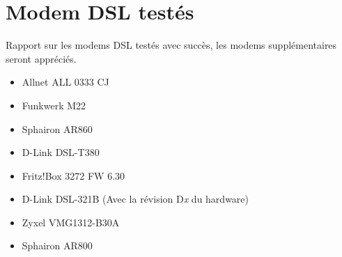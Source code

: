 \section{Modem DSL testés}

  Rapport sur les modems DSL testés avec succès, les modems supplémentaires
  seront appréciés.

\begin{itemize}
\item Allnet ALL 0333 CJ
\end{itemize}

\begin{itemize}
\item Funkwerk M22
\item Sphairon AR860
\item D-Link DSL-T380
\end{itemize}

\begin{itemize}
\item Fritz!Box 3272 FW 6.30
\end{itemize}

\begin{itemize}
\item D-Link DSL-321B
(Avec la révision D\emph{x} du hardware)
\item Zyxel VMG1312-B30A
\end{itemize}

\begin{itemize}
\item Sphairon AR800
\end{itemize}

